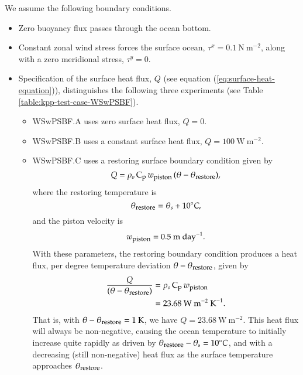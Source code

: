 We assume the following boundary conditions.
\begin{itemize}

\item Zero buoyancy flux passes through the ocean bottom.

\item Constant zonal wind stress forces the surface ocean, $\tau^{x} =
  0.1~\mbox{N}~\mbox{m}^{-2}$, along with a zero meridional stress,
  $\tau^{y} = 0$.

\item Specification of the surface heat flux, $Q$ (see equation
  (\ref{eq:surface-heat-equation})), distinguishes the following three
  experiments (see Table \ref{table:kpp-test-case-WSwPSBF}).

\begin{itemize} 

\item {\sc WSwPSBF.A} uses zero surface heat flux, $Q=0$.

\item {\sc WSwPSBF.B} uses a constant surface heat flux,
  $Q=100~\mbox{W}~\mbox{m}^{-2}$.

\item {\sc WSwPSBF.C} uses a restoring surface boundary condition
  given by
\begin{equation}
 Q =  \rho_o \, \mbox{C}_{\mbox{\footnotesize p}} \, w_{\mbox{\footnotesize piston}} \, (\theta - \theta_{\mbox{\footnotesize restore}} ),
\end{equation}
 where the restoring temperature is 
\begin{equation}
\theta_{\mbox{\footnotesize restore}}  = \theta_s + 10^{\circ}C,
\end{equation}
 and the piston velocity is 
\begin{equation}
  w_{\mbox{\footnotesize piston}} = 0.5~\mbox{m}~\mbox{day}^{-1}. 
\end{equation}
With these parameters, the restoring boundary condition produces a
heat flux, per degree temperature deviation $\theta -
\theta_{\mbox{\footnotesize restore}}$, given by
\begin{subequations}
\begin{align}
 \frac{Q}{(\theta - \theta_{\mbox{\footnotesize restore}} )} &= \rho_o \, \mbox{C}_{\mbox{\footnotesize p}} \, w_{\mbox{\footnotesize piston}}
 \\
 &= 23.68~\mbox{W}~\mbox{m}^{-2}~\mbox{K}^{-1}.  
\end{align}
\end{subequations}
That is, with $\theta - \theta_{\mbox{\footnotesize restore}} =
1~\mbox{K}$, we have $Q = 23.68~\mbox{W}~\mbox{m}^{-2}$.  This heat
flux will always be non-negative, causing the ocean temperature to
initially increase quite rapidly as driven by
$\theta_{\mbox{\footnotesize restore}} - \theta_s = 10^{\circ}C$, and
with a decreasing (still non-negative) heat flux as the surface
temperature approaches $\theta_{\mbox{\footnotesize restore}}$.

\end{itemize} 

\end{itemize}


